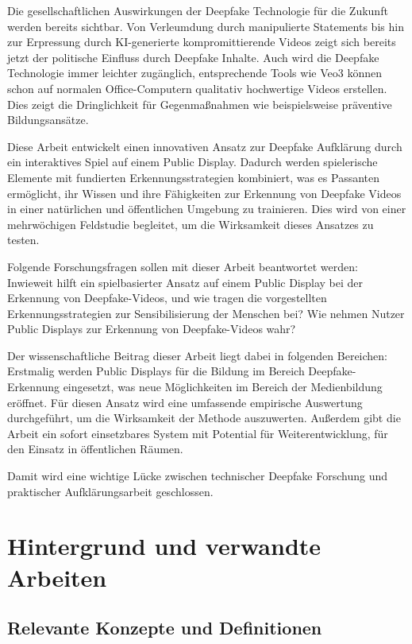 Die gesellschaftlichen Auswirkungen der Deepfake Technologie für die Zukunft werden bereits sichtbar. 
Von Verleumdung durch manipulierte Statements bis hin zur Erpressung durch KI-generierte kompromittierende Videos \cite{PDFImpactDeepfake2025} 
zeigt sich bereits jetzt der politische Einfluss durch Deepfake Inhalte. 
Auch wird die Deepfake Technologie immer leichter zugänglich, 
entsprechende Tools wie Veo3 können schon auf normalen Office-Computern qualitativ hochwertige Videos erstellen. 
Dies zeigt die Dringlichkeit für Gegenmaßnahmen wie beispielsweise präventive Bildungsansätze.

Diese Arbeit entwickelt einen innovativen Ansatz zur Deepfake Aufklärung durch ein interaktives Spiel auf einem Public Display. 
Dadurch werden spielerische Elemente mit fundierten Erkennungsstrategien kombiniert, was es Passanten ermöglicht, 
ihr Wissen und ihre Fähigkeiten zur Erkennung von Deepfake Videos in einer natürlichen und öffentlichen Umgebung zu trainieren. 
Dies wird von einer mehrwöchigen Feldstudie begleitet, um die Wirksamkeit dieses Ansatzes zu testen.

Folgende Forschungsfragen sollen mit dieser Arbeit beantwortet werden: 
Inwieweit hilft ein spielbasierter Ansatz auf einem Public Display bei der Erkennung von Deepfake-Videos, 
und wie tragen die vorgestellten Erkennungsstrategien zur Sensibilisierung der Menschen bei?
Wie nehmen Nutzer Public Displays zur Erkennung von Deepfake-Videos wahr?

Der wissenschaftliche Beitrag dieser Arbeit liegt dabei in folgenden Bereichen: 
Erstmalig werden Public Displays für die Bildung im Bereich Deepfake-Erkennung eingesetzt, was neue Möglichkeiten im Bereich der Medienbildung eröffnet. 
Für diesen Ansatz wird eine umfassende empirische Auswertung durchgeführt, um die Wirksamkeit der Methode auszuwerten.
Außerdem gibt die Arbeit ein sofort einsetzbares System mit Potential für Weiterentwicklung, für den Einsatz in öffentlichen Räumen.

Damit wird eine wichtige Lücke zwischen technischer Deepfake Forschung und praktischer Aufklärungsarbeit geschlossen.

\chapter{Hintergrund und verwandte Arbeiten}
\section{Relevante Konzepte und Definitionen}
